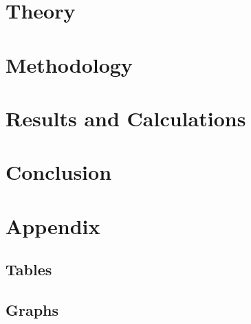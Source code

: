 \documentclass[12pt]{article}
\begin{document}

\vspace{4cm}

\section{Theory} \label{sec:1}

\cite{rian}

\section{Methodology} \label{sec:2}



\section{Results and Calculations} \label{sec:3}



\newpage

\section{Conclusion} \label{sec:4}



\newpage



 \label{sec:ref}

\vspace{1.5cm}

\listoffigures

\listoftables

\section*{Appendix} \label{sec:A}

\subsection*{Tables}



\subsection*{Graphs}
\end{document}

